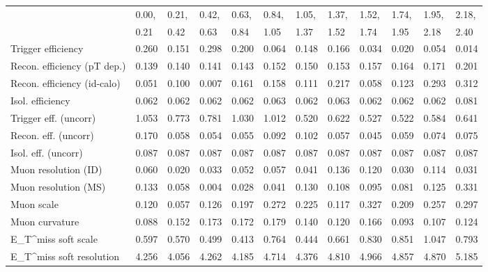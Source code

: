 \begin{tabular}{l|p{0.6cm}p{0.6cm}p{0.6cm}p{0.6cm}p{0.6cm}p{0.6cm}p{0.6cm}p{0.6cm}p{0.6cm}p{0.6cm}p{0.6cm}}
\hline
   & 0.00, & 0.21, & 0.42, & 0.63, & 0.84, & 1.05, & 1.37, & 1.52, & 1.74, & 1.95, & 2.18,  \\ 
   & 0.21 & 0.42 & 0.63 & 0.84 & 1.05 & 1.37 & 1.52 & 1.74 & 1.95 & 2.18 & 2.40  \\ 
\hline
Trigger efficiency                       & 0.260 & 0.151 & 0.298 & 0.200 & 0.064 & 0.148 & 0.166 & 0.034 & 0.020 & 0.054 & 0.014 \\
Recon. efficiency (pT dep.)              & 0.139 & 0.140 & 0.141 & 0.143 & 0.152 & 0.150 & 0.153 & 0.157 & 0.164 & 0.171 & 0.201 \\
Recon. efficiency (id-calo)              & 0.051 & 0.100 & 0.007 & 0.161 & 0.158 & 0.111 & 0.217 & 0.058 & 0.123 & 0.293 & 0.312 \\
Isol. efficiency                         & 0.062 & 0.062 & 0.062 & 0.062 & 0.063 & 0.062 & 0.063 & 0.062 & 0.062 & 0.062 & 0.081 \\
Trigger eff. (uncorr)                    & 1.053 & 0.773 & 0.781 & 1.030 & 1.012 & 0.520 & 0.622 & 0.527 & 0.522 & 0.584 & 0.641 \\
Recon. eff. (uncorr)                     & 0.170 & 0.058 & 0.054 & 0.055 & 0.092 & 0.102 & 0.057 & 0.045 & 0.059 & 0.074 & 0.075 \\
Isol. eff. (uncorr)                      & 0.087 & 0.087 & 0.087 & 0.087 & 0.087 & 0.087 & 0.087 & 0.087 & 0.087 & 0.087 & 0.087 \\
Muon resolution (ID)                     & 0.060 & 0.020 & 0.033 & 0.052 & 0.057 & 0.041 & 0.136 & 0.120 & 0.030 & 0.114 & 0.031 \\
Muon resolution (MS)                     & 0.133 & 0.058 & 0.004 & 0.028 & 0.041 & 0.130 & 0.108 & 0.095 & 0.081 & 0.125 & 0.331 \\
Muon scale                               & 0.120 & 0.057 & 0.126 & 0.197 & 0.272 & 0.225 & 0.117 & 0.327 & 0.209 & 0.257 & 0.297 \\
Muon curvature                           & 0.088 & 0.152 & 0.173 & 0.172 & 0.179 & 0.140 & 0.120 & 0.166 & 0.093 & 0.107 & 0.124 \\
E_{T}^{miss} soft scale                  & 0.597 & 0.570 & 0.499 & 0.413 & 0.764 & 0.444 & 0.661 & 0.830 & 0.851 & 1.047 & 0.793 \\
E_{T}^{miss} soft resolution             & 4.256 & 4.056 & 4.262 & 4.185 & 4.714 & 4.376 & 4.810 & 4.966 & 4.857 & 4.870 & 5.185 \\

\end{tabular}
